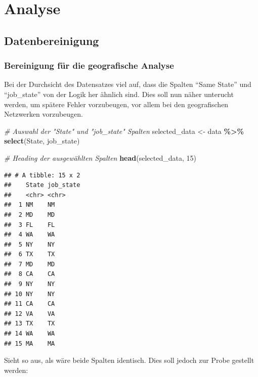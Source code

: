 \documentclass[
]{article}
\newenvironment{Shaded}{\begin{snugshade}}{\end{snugshade}}
\newcommand{\CommentTok}[1]{\textcolor[rgb]{0.56,0.35,0.01}{\textit{#1}}}
\newcommand{\DecValTok}[1]{\textcolor[rgb]{0.00,0.00,0.81}{#1}}
\newcommand{\FunctionTok}[1]{\textcolor[rgb]{0.13,0.29,0.53}{\textbf{#1}}}
\newcommand{\NormalTok}[1]{#1}
\newcommand{\OtherTok}[1]{\textcolor[rgb]{0.56,0.35,0.01}{#1}}
\newcommand{\SpecialCharTok}[1]{\textcolor[rgb]{0.81,0.36,0.00}{\textbf{#1}}}
\begin{document}
\newpage

\section{Analyse}\label{analyse}

\subsection{Datenbereinigung}\label{datenbereinigung}

\subsubsection{Bereinigung für die geografische
Analyse}\label{bereinigung-fuxfcr-die-geografische-analyse}

Bei der Durchsicht des Datensatzes viel auf, dass die Spalten ``Same
State'' und ``job\_state'' von der Logik her ähnlich sind. Dies soll nun
näher unterucht werden, um spätere Fehler vorzubeugen, vor allem bei den
geografischen Netzwerken vorzubeugen.

\begin{Shaded}
\begin{Highlighting}[]
\CommentTok{\# Auswahl der "State" und "job\_state" Spalten}
\NormalTok{selected\_data }\OtherTok{\textless{}{-}}\NormalTok{ data }\SpecialCharTok{\%\textgreater{}\%}
  \FunctionTok{select}\NormalTok{(State, job\_state)}

\CommentTok{\# Heading der ausgewählten Spalten}
\FunctionTok{head}\NormalTok{(selected\_data, }\DecValTok{15}\NormalTok{)}
\end{Highlighting}
\end{Shaded}

\begin{verbatim}
## # A tibble: 15 x 2
##    State job_state
##    <chr> <chr>    
##  1 NM    NM       
##  2 MD    MD       
##  3 FL    FL       
##  4 WA    WA       
##  5 NY    NY       
##  6 TX    TX       
##  7 MD    MD       
##  8 CA    CA       
##  9 NY    NY       
## 10 NY    NY       
## 11 CA    CA       
## 12 VA    VA       
## 13 TX    TX       
## 14 WA    WA       
## 15 MA    MA
\end{verbatim}

Sieht so aus, als wäre beide Spalten identisch. Dies soll jedoch zur
Probe gestellt werden:
\end{document}
